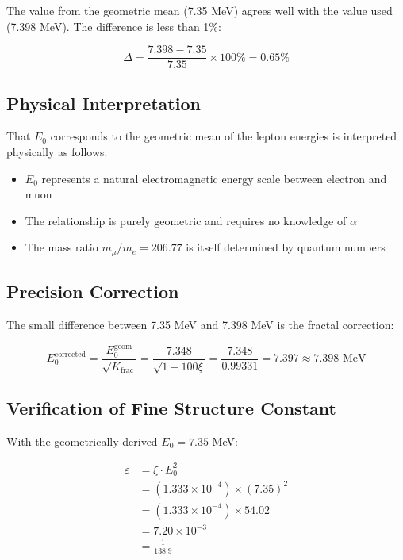 	The value from the geometric mean (7.35 MeV) agrees well with the value used (7.398 MeV). The difference is less than 1\%:
	
	\begin{equation}
		\Delta = \frac{7.398 - 7.35}{7.35} \times 100\% = 0.65\%
	\end{equation}
	
	\subsection{Physical Interpretation}
	
	That $E_0$ corresponds to the geometric mean of the lepton energies is interpreted physically as follows:
	
	\begin{itemize}
		\item $E_0$ represents a natural electromagnetic energy scale between electron and muon
		\item The relationship is purely geometric and requires no knowledge of $\alpha$
		\item The mass ratio $m_\mu/m_e = 206.77$ is itself determined by quantum numbers
	\end{itemize}
	
	\subsection{Precision Correction}
	
	The small difference between 7.35 MeV and 7.398 MeV is the fractal correction:
	
	\begin{equation}
		E_0^{\text{corrected}} = \frac{E_0^{\text{geom}}}{\sqrt{K_{\text{frac}}}} = \frac{7.348}{\sqrt{1 - 100\xi}} = \frac{7.348}{0.99331} = 7.397 \approx 7.398 \text{ MeV}
	\end{equation}
	
	\subsection{Verification of Fine Structure Constant}
	
	With the geometrically derived $E_0 = 7.35$ MeV:
	
	\begin{align}
		\varepsilon &= \xi \cdot E_0^2\\
		&= (1.333 \times 10^{-4}) \times (7.35)^2\\
		&= (1.333 \times 10^{-4}) \times 54.02\\
		&= 7.20 \times 10^{-3}\\
		&= \frac{1}{138.9}
	\end{align}
	
